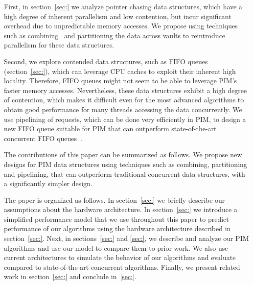 First, in section~\ref{sec:} we analyze pointer chasing data 
structures, which have a high degree of inherent parallelism and low contention, but incur significant 
overhead due to unpredictable memory accesses. 
We propose using techniques such as combining~\cite{} and partitioning 
the data across vaults to reintroduce parallelism for these data structures.

Second, we explore contended data structures, such as FIFO queues (section~\ref{sec:}),
 which can leverage CPU caches to exploit their inherent high locality. 
Therefore, FIFO queues might not seem to be able to leverage PIM's faster memory accesses. 
Nevertheless, these data structures exhibit a high degree of contention, which makes it difficult
even for the most advanced algorithms to obtain good performance for many threads accessing the data 
concurrently. We use pipelining of requests, which can be done very efficiently in PIM, to design a new FIFO queue suitable for PIM that can outperform state-of-the-art concurrent FIFO queues~\cite{}.

The contributions of this paper can be summarized as follows. 
We propose new designs for PIM 
data structures using 
techniques such as combining, partitioning and pipelining, that can outperform traditional 
concurrent data structures, with a significantly simpler design. 

The paper is organized as follows. In section~\ref{sec:} we briefly describe our assumptions
about the hardware architecture. In section~\ref{sec:} we introduce a simplified performance model 
that we use throughout this paper to predict performance of our algorithms using the hardware 
architecture described in section~\ref{sec:}. Next, in sections~\ref{sec:} and \ref{sec:}, 
we describe and analyze our PIM algorithms 
and use our model to compare them to prior work. We also use current architectures to simulate 
the behavior of our algorithms and evaluate compared to state-of-the-art concurrent algorithms. 
Finally, we present related work in section~\ref{sec:} and conclude in~\ref{sec:}. 

